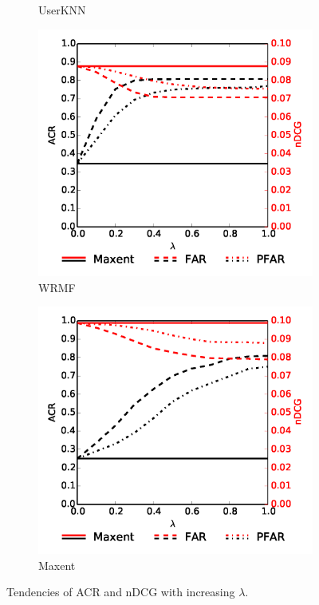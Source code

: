 \begin{figure}
\begin{subfigure}{0.49\columnwidth}
		\caption{UserKNN \cite{resnick1997recommender}} %
	\end{subfigure}
	\begin{subfigure}{0.49\columnwidth} %
		\includegraphics[width=\textwidth]{imgs/far/wrmf.png}
		\caption{WRMF \cite{hu2008collaborative}} %
	\end{subfigure}
	\begin{subfigure}{0.49\columnwidth} %
		\includegraphics[width=\textwidth]{imgs/far/maxent.png}
		\caption{Maxent \cite{choo2014gather}} %
	\end{subfigure}
	\caption{Tendencies of ACR and nDCG with increasing $\lambda$.\label{fig:kiva_results}} %
\end{figure}


